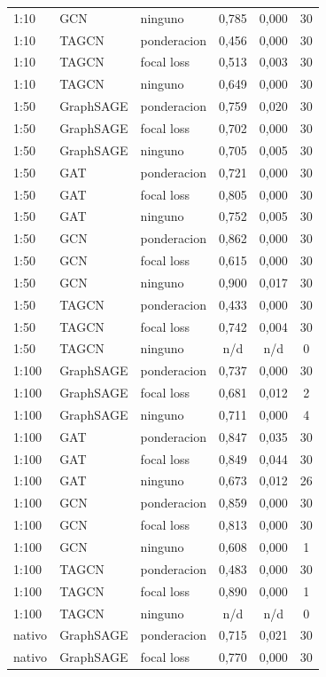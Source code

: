 \begin{longtable}{lllccc}
1:10 & GCN & ninguno & 0,785 & 0,000 & 30 \\
1:10 & TAGCN & ponderacion & 0,456 & 0,000 & 30 \\
1:10 & TAGCN & focal loss & 0,513 & 0,003 & 30 \\
1:10 & TAGCN & ninguno & 0,649 & 0,000 & 30 \\
1:50 & GraphSAGE & ponderacion & 0,759 & 0,020 & 30 \\
1:50 & GraphSAGE & focal loss & 0,702 & 0,000 & 30 \\
1:50 & GraphSAGE & ninguno & 0,705 & 0,005 & 30 \\
1:50 & GAT & ponderacion & 0,721 & 0,000 & 30 \\
1:50 & GAT & focal loss & 0,805 & 0,000 & 30 \\
1:50 & GAT & ninguno & 0,752 & 0,005 & 30 \\
1:50 & GCN & ponderacion & 0,862 & 0,000 & 30 \\
1:50 & GCN & focal loss & 0,615 & 0,000 & 30 \\
1:50 & GCN & ninguno & 0,900 & 0,017 & 30 \\
1:50 & TAGCN & ponderacion & 0,433 & 0,000 & 30 \\
1:50 & TAGCN & focal loss & 0,742 & 0,004 & 30 \\
1:50 & TAGCN & ninguno & n/d & n/d & 0 \\
1:100 & GraphSAGE & ponderacion & 0,737 & 0,000 & 30 \\
1:100 & GraphSAGE & focal loss & 0,681 & 0,012 & 2 \\
1:100 & GraphSAGE & ninguno & 0,711 & 0,000 & 4 \\
1:100 & GAT & ponderacion & 0,847 & 0,035 & 30 \\
1:100 & GAT & focal loss & 0,849 & 0,044 & 30 \\
1:100 & GAT & ninguno & 0,673 & 0,012 & 26 \\
1:100 & GCN & ponderacion & 0,859 & 0,000 & 30 \\
1:100 & GCN & focal loss & 0,813 & 0,000 & 30 \\
1:100 & GCN & ninguno & 0,608 & 0,000 & 1 \\
1:100 & TAGCN & ponderacion & 0,483 & 0,000 & 30 \\
1:100 & TAGCN & focal loss & 0,890 & 0,000 & 1 \\
1:100 & TAGCN & ninguno & n/d & n/d & 0 \\
nativo & GraphSAGE & ponderacion & 0,715 & 0,021 & 30 \\
nativo & GraphSAGE & focal loss & 0,770 & 0,000 & 30 \\

\end{longtable}
